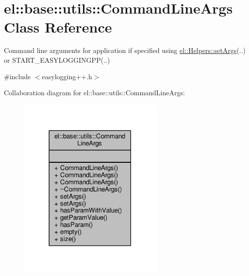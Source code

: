 \hypertarget{classel_1_1base_1_1utils_1_1CommandLineArgs}{}\section{el\+:\+:base\+:\+:utils\+:\+:Command\+Line\+Args Class Reference}
\label{classel_1_1base_1_1utils_1_1CommandLineArgs}


Command line arguments for application if specified using \hyperlink{classel_1_1Helpers_a68748f618a0c2840b96dc12532b09bf0}{el\+::\+Helpers\+::set\+Args}(..) or S\+T\+A\+R\+T\+\_\+\+E\+A\+S\+Y\+L\+O\+G\+G\+I\+N\+G\+PP(..)  




{\ttfamily \#include $<$easylogging++.\+h$>$}



Collaboration diagram for el\+:\+:base\+:\+:utils\+:\+:Command\+Line\+Args\+:
\nopagebreak
\begin{figure}[H]
\begin{center}
\leavevmode
\includegraphics[width=206pt]{d7/d46/classel_1_1base_1_1utils_1_1CommandLineArgs__coll__graph}
\end{center}
\end{figure}
